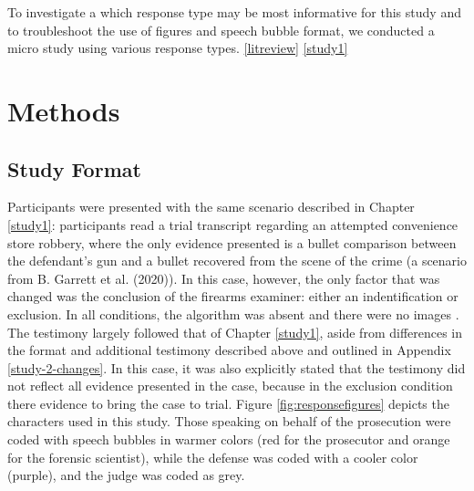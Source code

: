 \documentclass[print]{nuthesis}
\begin{document}
To investigate a which response type may be most informative for this study and to troubleshoot the use of figures and speech bubble format, we conducted a micro study using various response types.
 \ref{litreview} \ref{study1} 

\hypertarget{methods-1}{%
\section{Methods}\label{methods-1}}

\hypertarget{study-format-1}{%
\subsection{Study Format}\label{study-format-1}}

Participants were presented with the same scenario described in Chapter \ref{study1}: participants read a trial transcript regarding an attempted convenience store robbery, where the only evidence presented is a bullet comparison between the defendant's gun and a bullet recovered from the scene of the crime (a scenario from B. Garrett et al. (2020)).
In this case, however, the only factor that was changed was the conclusion of the firearms examiner: either an indentification or exclusion.
In all conditions, the algorithm was absent and there were no images .
The testimony largely followed that of Chapter \ref{study1}, aside from differences in the format and additional testimony described above and outlined in Appendix \ref{study-2-changes}.
In this case, it was also explicitly stated that the testimony did not reflect all evidence presented in the case, because in the exclusion condition there  evidence to bring the case to trial.
Figure \ref{fig:responsefigures} depicts the characters used in this study.
Those speaking on behalf of the prosecution were coded with speech bubbles in warmer colors (red for the prosecutor and orange for the forensic scientist), while the defense was coded with a cooler color (purple), and the judge was coded as grey.
\end{document}
